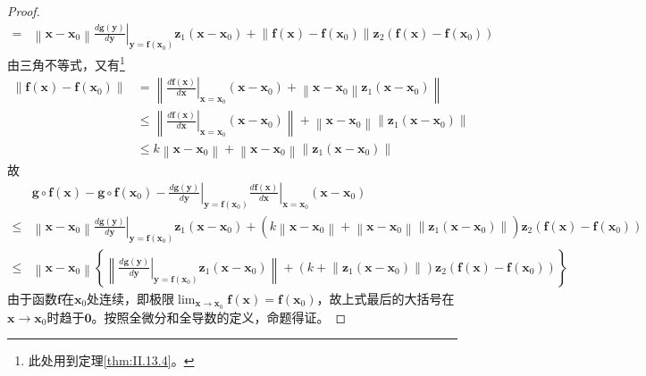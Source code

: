 \documentclass[main.tex]{subfiles}
\begin{document}
\begin{proof}
\begin{align*}
=&\left\|\mathbf{x}-\mathbf{x}_0\right\|\left.\frac{d\mathbf{g}\left(\mathbf{y}\right)}{d\mathbf{y}}\right|_{\mathbf{y}=\mathbf{f}\left(\mathbf{x}_0\right)}\mathbf{z}_1\left(\mathbf{x}-\mathbf{x}_0\right)+\left\|\mathbf{f}\left(\mathbf{x}\right)-\mathbf{f}\left(\mathbf{x}_0\right)\right\|\mathbf{z}_2\left(\mathbf{f}\left(\mathbf{x}\right)-\mathbf{f}\left(\mathbf{x}_0\right)\right)
\end{align*}
由三角不等式，又有\footnote{
此处用到定理\ref{thm:II.13.4}。
}
\begin{align*}
    \left\|\mathbf{f}\left(\mathbf{x}\right)-\mathbf{f}\left(\mathbf{x}_0\right)\right\|&=\left\|\left.\frac{d\mathbf{f}\left(\mathbf{x}\right)}{d\mathbf{x}}\right|_{\mathbf{x}=\mathbf{x}_0}\left(\mathbf{x}-\mathbf{x}_0\right)+\left\|\mathbf{x}-\mathbf{x}_0\right\|\mathbf{z}_1\left(\mathbf{x}-\mathbf{x}_0\right)\right\|\\
    &\leq \left\|\left.\frac{d\mathbf{f}\left(\mathbf{x}\right)}{d\mathbf{x}}\right|_{\mathbf{x}=\mathbf{x}_0}\left(\mathbf{x}-\mathbf{x}_0\right)\right\|+\left\|\mathbf{x}-\mathbf{x}_0\right\|\left\|\mathbf{z}_1\left(\mathbf{x}-\mathbf{x}_0\right)\right\|\\
    &\leq k\left\|\mathbf{x}-\mathbf{x}_0\right\|+\left\|\mathbf{x}-\mathbf{x}_0\right\|\left\|\mathbf{z}_1\left(\mathbf{x}-\mathbf{x}_0\right)\right\|
\end{align*}
故
\begin{align*}
    &\mathbf{g}\circ\mathbf{f}\left(\mathbf{x}\right)-\mathbf{g}\circ\mathbf{f}\left(\mathbf{x}_0\right)-\left.\frac{d\mathbf{g}\left(\mathbf{y}\right)}{d\mathbf{y}}\right|_{\mathbf{y}=\mathbf{f}\left(\mathbf{x}_0\right)}\left.\frac{d\mathbf{f}\left(\mathbf{x}\right)}{d\mathbf{x}}\right|_{\mathbf{x}=\mathbf{x}_0}\left(\mathbf{x}-\mathbf{x}_0\right)\\
    \leq&\left\|\mathbf{x}-\mathbf{x}_0\right\|\left.\frac{d\mathbf{g}\left(\mathbf{y}\right)}{d\mathbf{y}}\right|_{\mathbf{y}=\mathbf{f}\left(\mathbf{x}_0\right)}\mathbf{z}_1\left(\mathbf{x}-\mathbf{x}_0\right)+\left(k\left\|\mathbf{x}-\mathbf{x}_0\right\|+\left\|\mathbf{x}-\mathbf{x}_0\right\|\left\|\mathbf{z}_1\left(\mathbf{x}-\mathbf{x}_0\right)\right\|\right)\mathbf{z}_2\left(\mathbf{f}\left(\mathbf{x}\right)-\mathbf{f}\left(\mathbf{x}_0\right)\right)\\
    \leq&\left\|\mathbf{x}-\mathbf{x}_0\right\|\left\{\left\|\left.\frac{d\mathbf{g}\left(\mathbf{y}\right)}{d\mathbf{y}}\right|_{\mathbf{y}=\mathbf{f}\left(\mathbf{x}_0\right)}\mathbf{z}_1\left(\mathbf{x}-\mathbf{x}_0\right)\right\|+\left(k+\left\|\mathbf{z}_1\left(\mathbf{x}-\mathbf{x}_0\right)\right\|\right)\mathbf{z}_2\left(\mathbf{f}\left(\mathbf{x}\right)-\mathbf{f}\left(\mathbf{x}_0\right)\right)\right\}
\end{align*}
由于函数$\mathbf{f}$在$\mathbf{x}_0$处连续，即极限$\lim_{\mathbf{x}\to\mathbf{x}_0}\mathbf{f}\left(\mathbf{x}\right)=\mathbf{f}\left(\mathbf{x}_0\right)$，故上式最后的大括号在$\mathbf{x}\to\mathbf{x}_0$时趋于$\mathbf{0}$。按照全微分和全导数的定义，命题得证。
\end{proof}
\end{document}
